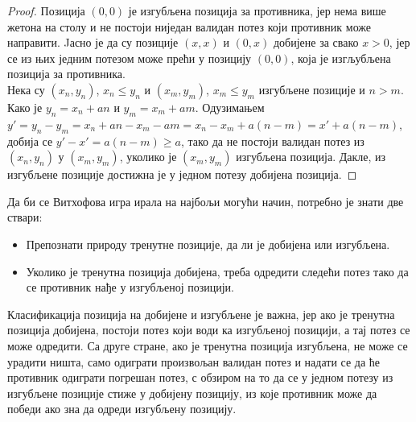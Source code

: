 \documentclass[a4paper]{article}
\begin{document}
\begin{proof}
	Позиција $ (0, 0) $ је изгубљена позиција за противника, јер нема више жетона на столу и не постоји ниједан валидан потез који противник може направити. Jасно је да су позиције $ (x, x) $ и $ (0, x) $ добијене за свако $ x > 0 $,  јер се из њих једним потезом може прећи у позицију $ (0, 0) $, која је изгљубљена позиција за противника.\\
	Нека су $ (x_{n}, y_{n}) $, $ x_{n} \le y_{n} $ и $ (x_{m}, y_{m}) $, $ x_{m} \le y_{m} $ изгубљене позиције и $ n > m $. Како је $ y_{n} = x_{n} + an $ и $ y_{m} = x_{m} + am $. Одузимањем $ y' = y_{n} - y_{m} = x_{n} + an - x_{m} - am = x_{n} - x_{m} + a(n - m) = x' + a(n - m) $, добија се $ y' - x' = a(n - m) \ge a $, тако да не постоји валидан потез из $ (x_{n}, y_{n}) $ у $ (x_{m}, y_{m}) $, уколико је $ (x_{m}, y_{m}) $ изгубљена позиција.
	Дакле, из изгубљене позиције достижна је у једном потезу добијена позиција.
\end{proof}

Да би се Витхофова игра ирала на најбољи могући начин, потребно је знати две ствари:
\begin{itemize}
	\item Препознати природу тренутне позиције, да ли је добијена или изгубљена.
	\item Уколико је тренутна позиција добијена, треба одредити следећи потез тако да се противник нађе у изгубљеној позицији.
\end{itemize}

Класификација позиција на добијене и изгубљене је важна, јер ако је тренутна позиција добијена, постоји потез који води ка изгубљеној позицији, а тај потез се може одредити. Са друге стране, ако је тренутна позиција изгубљена, не може се урадити ништа, само одиграти произвољан валидан потез и надати се да ће противник одиграти погрешан потез, с обзиром на то да се у једном потезу из изгубљене позиције стиже у добијену позицију, из које противник може да победи ако зна да одреди изгубљену позицију. 
\end{document}
